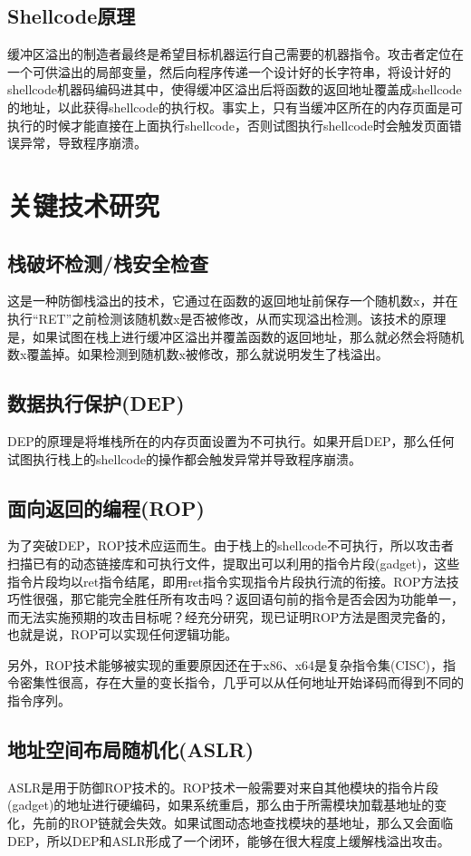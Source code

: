 \documentclass[bachelor]{thesis-uestc}
\begin{document}
\section{Shellcode原理}
缓冲区溢出的制造者最终是希望目标机器运行自己需要的机器指令。攻击者定位在一个可供溢出的局部变量，然后向程序传递一个设计好的长字符串，将设计好的shellcode机器码编码进其中，使得缓冲区溢出后将函数的返回地址覆盖成shellcode的地址，以此获得shellcode的执行权。事实上，只有当缓冲区所在的内存页面是可执行的时候才能直接在上面执行shellcode，否则试图执行shellcode时会触发页面错误异常，导致程序崩溃。

\chapter{关键技术研究}
\section{栈破坏检测/栈安全检查}
这是一种防御栈溢出的技术，它通过在函数的返回地址前保存一个随机数x，并在执行``RET''之前检测该随机数x是否被修改，从而实现溢出检测。该技术的原理是，如果试图在栈上进行缓冲区溢出并覆盖函数的返回地址，那么就必然会将随机数x覆盖掉。如果检测到随机数x被修改，那么就说明发生了栈溢出。

\section{数据执行保护(DEP)}
DEP的原理是将堆栈所在的内存页面设置为不可执行。如果开启DEP，那么任何试图执行栈上的shellcode的操作都会触发异常并导致程序崩溃。

\section{面向返回的编程(ROP)}
为了突破DEP，ROP技术应运而生。由于栈上的shellcode不可执行，所以攻击者扫描已有的动态链接库和可执行文件，提取出可以利用的指令片段(gadget)，这些指令片段均以ret指令结尾，即用ret指令实现指令片段执行流的衔接。ROP方法技巧性很强，那它能完全胜任所有攻击吗？返回语句前的指令是否会因为功能单一，而无法实施预期的攻击目标呢？经充分研究，现已证明ROP方法是图灵完备的，也就是说，ROP可以实现任何逻辑功能。\par
另外，ROP技术能够被实现的重要原因还在于x86、x64是复杂指令集(CISC)，指令密集性很高，存在大量的变长指令，几乎可以从任何地址开始译码而得到不同的指令序列。

\section{地址空间布局随机化(ASLR)}
ASLR是用于防御ROP技术的。ROP技术一般需要对来自其他模块的指令片段(gadget)的地址进行硬编码，如果系统重启，那么由于所需模块加载基地址的变化，先前的ROP链就会失效。如果试图动态地查找模块的基地址，那么又会面临DEP，所以DEP和ASLR形成了一个闭环，能够在很大程度上缓解栈溢出攻击。
\end{document}
